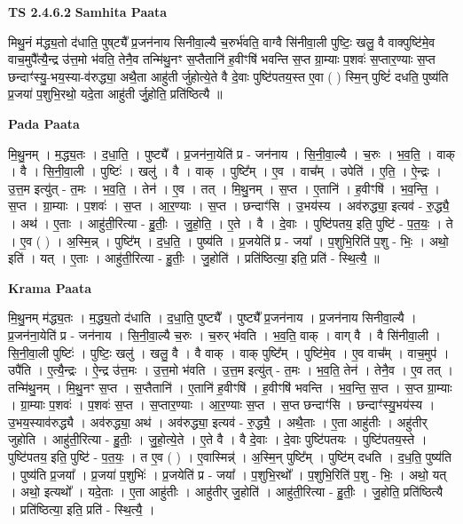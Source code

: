 \documentclass[17pt]{extarticle}
\begin{document}
\textbf{TS 2.4.6.2 } \newline
\textbf{Samhita Paata} \newline

मिथु॒नं म॑द्ध्य॒तो द॑धाति॒ पुष्‌ट्यै᳚ प्र॒जन॑नाय सिनीवा॒ल्यै च॒रुर्भ॑वति॒ वाग्वै सि॑नीवा॒ली पुष्टिः॒ खलु॒ वै वाक्पुष्टि॑मे॒व वाच॒मुपै᳚त्यै॒न्द्र उ॑त्त॒मो भ॑वति॒ तेनै॒व तन्मि॑थु॒नꣳ स॒प्तैतानि॑ ह॒वीꣳषि॑ भवन्ति स॒प्त ग्रा॒म्याः प॒शवः॑ स॒प्तार॒ण्याः स॒प्त छन्दाꣳ॑स्यु॒-भय॒स्या-व॑रुद्ध्या॒ अथै॒ता आहु॑ती र्जुहोत्ये॒ते वै दे॒वाः पुष्टि॑पतय॒स्त ए॒वा ( ) स्मि॒न् पुष्टिं॑ दधति॒ पुष्य॑ति प्र॒जया॑ प॒शुभि॒रथो॒ यदे॒ता आहु॑ती र्जु॒होति॒ प्रति॑ष्ठित्यै ॥ \newline

\textbf{Pada Paata} \newline

मि॒थु॒नम् । म॒द्ध्य॒तः । द॒धा॒ति॒ । पुष्ट्यै᳚ । प्र॒जन॑ना॒येति॑ प्र - जन॑नाय । सि॒नी॒वा॒ल्यै । च॒रुः । भ॒व॒ति॒ । वाक् । वै । सि॒नी॒वा॒ली । पुष्टिः॑ । खलु॑ । वै । वाक् । पुष्टि᳚म् । ए॒व । वाच᳚म् । उपेति॑ । ए॒ति॒ । ऐ॒न्द्रः । उ॒त्त॒म इत्यु॑त् - त॒मः । भ॒व॒ति॒ । तेन॑ । ए॒व । तत् । मि॒थु॒नम् । स॒प्त । ए॒तानि॑ । ह॒वीꣳषि॑ । भ॒व॒न्ति॒ । स॒प्त । ग्रा॒म्याः । प॒शवः॑ । स॒प्त । आ॒र॒ण्याः । स॒प्त । छन्दाꣳ॑सि । उ॒भय॑स्य । अव॑रुद्ध्या॒ इत्यव॑ - रु॒द्ध्यै॒ । अथ॑ । ए॒ताः । आहु॑ती॒रित्या - हु॒तीः॒ । जु॒हो॒ति॒ । ए॒ते । वै । दे॒वाः । पुष्टि॑पतय॒ इति॒ पुष्टि॑ - प॒त॒यः॒ । ते । ए॒व ( ) । अ॒स्मि॒न्न् । पुष्टि᳚म् । द॒ध॒ति॒ । पुष्य॑ति । प्र॒जयेति॑ प्र - जया᳚ । प॒शुभि॒रिति॑ प॒शु - भिः॒ । अथो॒ इति॑ । यत् । ए॒ताः । आहु॑ती॒रित्या - हु॒तीः॒ । जु॒होति॑ । प्रति॑ष्ठित्या॒ इति॒ प्रति॑ - स्थि॒त्यै॒ ॥  \newline


\textbf{Krama Paata} \newline

मि॒थु॒नम् म॑द्ध्य॒तः । म॒द्ध्य॒तो द॑धाति । द॒धा॒ति॒ पुष्ट्यै᳚ । पुष्ट्यै᳚ प्र॒जन॑नाय । प्र॒जन॑नाय सिनीवा॒ल्यै । प्र॒जन॑ना॒येति॑ प्र - जन॑नाय । सि॒नी॒वा॒ल्यै च॒रुः । च॒रुर् भ॑वति । भ॒व॒ति॒ वाक् । वाग् वै । वै सि॑नीवा॒ली । सि॒नी॒वा॒ली पुष्टिः॑ । पुष्टिः॒ खलु॑ । खलु॒ वै । वै वाक् । वाक् पुष्टि᳚म् । पुष्टि॑मे॒व । ए॒व वाच᳚म् । वाच॒मुप॑ । उपै॑ति । ए॒त्यै॒न्द्रः । ऐ॒न्द्र उ॑त्त॒मः । उ॒त्त॒मो भ॑वति । उ॒त्त॒म इत्यु॑त् - त॒मः । भ॒व॒ति॒ तेन॑ । तेनै॒व । ए॒व तत् । तन्मि॑थु॒नम् । मि॒थु॒नꣳ स॒प्त । स॒प्तैतानि॑ । ए॒तानि॑ ह॒वीꣳषि॑ । ह॒वीꣳषि॑ भवन्ति । भ॒व॒न्ति॒ स॒प्त । स॒प्त ग्रा॒म्याः । ग्रा॒म्याः प॒शवः॑ । प॒शवः॑ स॒प्त । स॒प्तार॒ण्याः । आ॒र॒ण्याः स॒प्त । स॒प्त छन्दाꣳ॑सि । छन्दाꣳ॑स्यु॒भय॑स्य । उ॒भय॒स्याव॑रुद्ध्यै । अव॑रुद्ध्या॒ अथ॑ । अव॑रुद्ध्या॒ इत्यव॑ - रु॒द्ध्यै॒ । अथै॒ताः । ए॒ता आहु॑तीः । अहु॑तीर् जुहोति । आहु॑ती॒रित्या - हु॒तीः॒ । जु॒हो॒त्ये॒ते । ए॒ते वै । वै दे॒वाः । दे॒वाः पुष्टि॑पतयः । पुष्टि॑पतय॒स्ते । पुष्टि॑पतय॒ इति॒ पुष्टि॑ - प॒त॒यः॒ । त ए॒व ( ) । ए॒वास्मिन्न्॑ । अ॒स्मि॒न् पुष्टि᳚म् । पुष्टि॑म् दधति । द॒ध॒ति॒ पुष्य॑ति । पुष्य॑ति प्र॒जया᳚ । प्र॒जया॑ प॒शुभिः॑ । प्र॒जयेति॑ प्र - जया᳚ । प॒शुभि॒रथो᳚ । प॒शुभि॒रिति॑ प॒शु - भिः॒ । अथो॒ यत् । अथो॒ इत्यथो᳚ । यदे॒ताः । ए॒ता आहु॑तीः । आहु॑तीर् जु॒होति॑ । आहु॑ती॒रित्या - हु॒तीः॒ । जु॒होति॒ प्रति॑ष्ठित्यै । प्रति॑ष्ठित्या॒ इति॒ प्रति॑ - स्थि॒त्यै॒ । \newline
\end{document}
